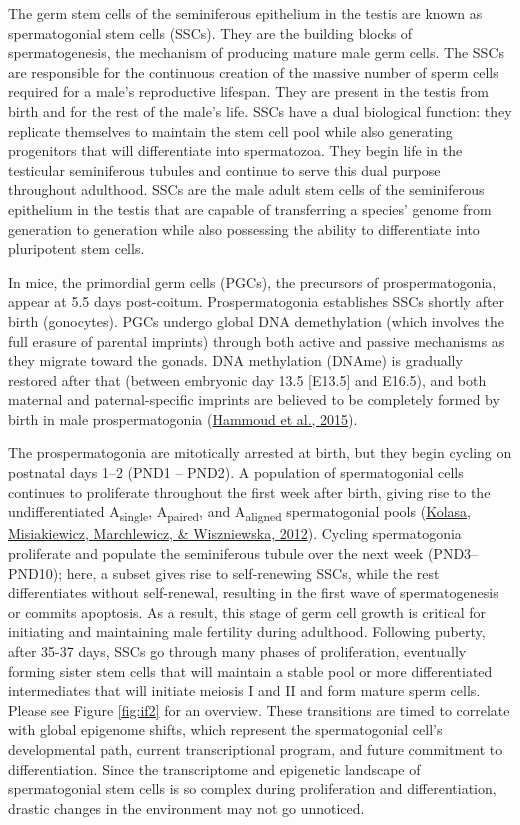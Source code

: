 \documentclass[12pt,twoside]{reedthesis}
\begin{document}
The germ stem cells of the seminiferous epithelium in the testis are
known as spermatogonial stem cells (SSCs). They are the building blocks
of spermatogenesis, the mechanism of producing mature male germ cells.
The SSCs are responsible for the continuous creation of the massive
number of sperm cells required for a male's reproductive lifespan. They
are present in the testis from birth and for the rest of the male's
life. SSCs have a dual biological function: they replicate themselves to
maintain the stem cell pool while also generating progenitors that will
differentiate into spermatozoa. They begin life in the testicular
seminiferous tubules and continue to serve this dual purpose throughout
adulthood. SSCs are the male adult stem cells of the seminiferous
epithelium in the testis that are capable of transferring a species'
genome from generation to generation while also possessing the ability
to differentiate into pluripotent stem cells.

In mice, the primordial germ cells (PGCs), the precursors of
prospermatogonia, appear at 5.5 days post-coitum. Prospermatogonia
establishes SSCs shortly after birth (gonocytes). PGCs undergo global
DNA demethylation (which involves the full erasure of parental imprints)
through both active and passive mechanisms as they migrate toward the
gonads. DNA methylation (DNAme) is gradually restored after that
(between embryonic day 13.5 {[}E13.5{]} and E16.5), and both maternal and
paternal-specific imprints are believed to be completely formed by birth
in male prospermatogonia (\protect\hyperlink{ref-hammoud2015}{Hammoud et al., 2015}).

The prospermatogonia are mitotically arrested at birth, but they begin
cycling on postnatal days 1--2 (PND1 -- PND2). A population of
spermatogonial cells continues to proliferate throughout the first week
after birth, giving rise to the undifferentiated A\textsubscript{single}, A\textsubscript{paired}, and A\textsubscript{aligned} spermatogonial pools (\protect\hyperlink{ref-kolasa2012}{Kolasa, Misiakiewicz, Marchlewicz, \& Wiszniewska, 2012}). Cycling
spermatogonia proliferate and populate the seminiferous tubule over the
next week (PND3--PND10); here, a subset gives rise to self-renewing
SSCs, while the rest differentiates without self-renewal, resulting in
the first wave of spermatogenesis or commits apoptosis. As a result,
this stage of germ cell growth is critical for initiating and
maintaining male fertility during adulthood. Following puberty, after
35-37 days, SSCs go through many phases of proliferation, eventually
forming sister stem cells that will maintain a stable pool or more
differentiated intermediates that will initiate meiosis I and II and
form mature sperm cells. Please see Figure \ref{fig:if2} for an overview. These transitions are timed to correlate with
global epigenome shifts, which represent the spermatogonial cell's
developmental path, current transcriptional program, and future
commitment to differentiation. Since the transcriptome and epigenetic
landscape of spermatogonial stem cells is so complex during
proliferation and differentiation, drastic changes in the environment
may not go unnoticed.
\end{document}
